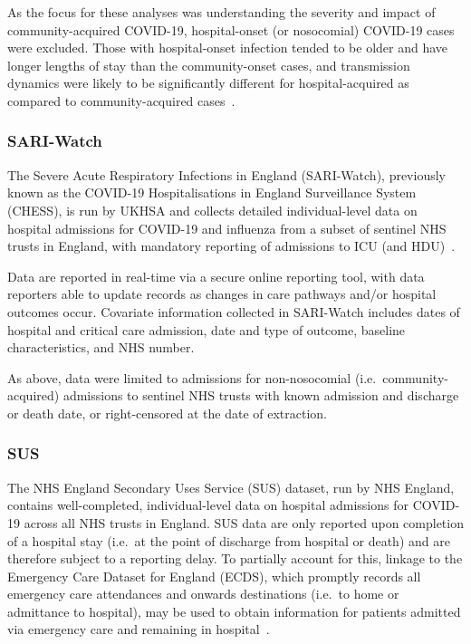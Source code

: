 As the focus for these analyses was understanding the severity and impact of community-acquired COVID-19, hospital-onset (or nosocomial) COVID-19 cases were excluded. Those with hospital-onset infection tended to be older and have longer lengths of stay than the community-onset cases, and transmission dynamics were likely to be significantly different for hospital-acquired as compared to community-acquired cases~\parencite{Cooper2023-sp, Evans2022-ob}.

\subsubsection{SARI-Watch}

The Severe Acute Respiratory Infections in England (SARI-Watch), previously known as the COVID-19 Hospitalisations in England Surveillance System (CHESS), is run by UKHSA and collects detailed individual-level data on hospital admissions for COVID-19 and influenza from a subset of sentinel NHS trusts in England, with mandatory reporting of admissions to ICU (and HDU)~\parencite{Public_Health_England2021-ao}.

Data are reported in real-time via a secure online reporting tool, with data reporters able to update records as changes in care pathways and/or hospital outcomes occur. Covariate information collected in SARI-Watch includes dates of hospital and critical care admission, date and type of outcome, baseline characteristics, and NHS number.

As above, data were limited to admissions for non-nosocomial (i.e.\ community-acquired) admissions to sentinel NHS trusts with known admission and discharge or death date, or right-censored at the date of extraction.

\subsubsection{SUS}

The NHS England Secondary Uses Service (SUS) dataset, run by NHS England, contains well-completed, individual-level data on hospital admissions for COVID-19 across all NHS trusts in England. SUS data are only reported upon completion of a hospital stay (i.e.\ at the point of discharge from hospital or death) and are therefore subject to a reporting delay. To partially account for this, linkage to the Emergency Care Dataset for England (ECDS), which promptly records all emergency care attendances and onwards destinations (i.e.\ to home or admittance to hospital), may be used to obtain information for patients admitted via emergency care and remaining in hospital~\parencite{NHS-Digital2023-iv}.

